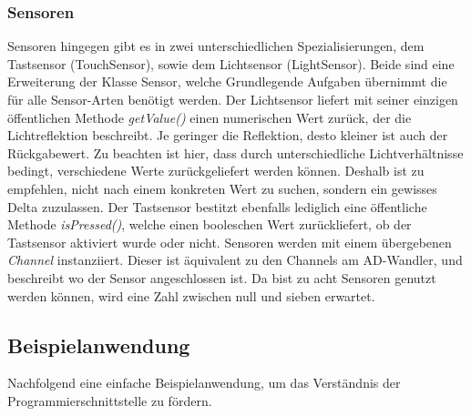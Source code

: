 \subsubsection{Sensoren}
Sensoren hingegen gibt es in zwei unterschiedlichen Spezialisierungen, dem Tastsensor (TouchSensor), sowie dem Lichtsensor (LightSensor). Beide sind eine Erweiterung der Klasse Sensor, welche Grundlegende Aufgaben übernimmt die für alle Sensor-Arten benötigt werden. Der Lichtsensor liefert mit seiner einzigen öffentlichen Methode \emph{getValue()} einen numerischen Wert zurück, der die Lichtreflektion beschreibt. Je geringer die Reflektion, desto kleiner ist auch der Rückgabewert. Zu beachten ist hier, dass durch unterschiedliche Lichtverhältnisse bedingt, verschiedene Werte zurückgeliefert werden können. Deshalb ist zu empfehlen, nicht nach einem konkreten Wert zu suchen, sondern ein gewisses Delta zuzulassen. Der Tastsensor bestitzt ebenfalls lediglich eine öffentliche Methode \emph{isPressed()}, welche einen booleschen Wert zurückliefert, ob der Tastsensor aktiviert wurde oder nicht. Sensoren werden mit einem übergebenen \emph{Channel} instanziiert. Dieser ist äquivalent zu den Channels am AD-Wandler, und beschreibt wo der Sensor angeschlossen ist. Da bist zu acht Sensoren genutzt werden können, wird eine Zahl zwischen null und sieben erwartet.

\subsection{Beispielanwendung}

Nachfolgend eine einfache Beispielanwendung, um das Verständnis der Programmierschnittstelle zu fördern.



